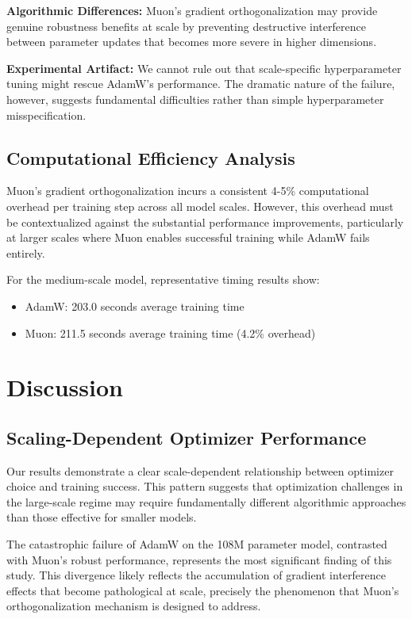 \documentclass[11pt,a4paper]{article}
\begin{document}
\textbf{Algorithmic Differences:} Muon's gradient orthogonalization may provide genuine robustness benefits at scale by preventing destructive interference between parameter updates that becomes more severe in higher dimensions.

\textbf{Experimental Artifact:} We cannot rule out that scale-specific hyperparameter tuning might rescue AdamW's performance. The dramatic nature of the failure, however, suggests fundamental difficulties rather than simple hyperparameter misspecification.

\subsection{Computational Efficiency Analysis}

Muon's gradient orthogonalization incurs a consistent 4-5\% computational overhead per training step across all model scales. However, this overhead must be contextualized against the substantial performance improvements, particularly at larger scales where Muon enables successful training while AdamW fails entirely.

For the medium-scale model, representative timing results show:
\begin{itemize}[leftmargin=*]
    \item AdamW: 203.0 seconds average training time
    \item Muon: 211.5 seconds average training time (4.2\% overhead)
\end{itemize}

\section{Discussion}

\subsection{Scaling-Dependent Optimizer Performance}

Our results demonstrate a clear scale-dependent relationship between optimizer choice and training success. This pattern suggests that optimization challenges in the large-scale regime may require fundamentally different algorithmic approaches than those effective for smaller models.

The catastrophic failure of AdamW on the 108M parameter model, contrasted with Muon's robust performance, represents the most significant finding of this study. This divergence likely reflects the accumulation of gradient interference effects that become pathological at scale, precisely the phenomenon that Muon's orthogonalization mechanism is designed to address.
\end{document}
